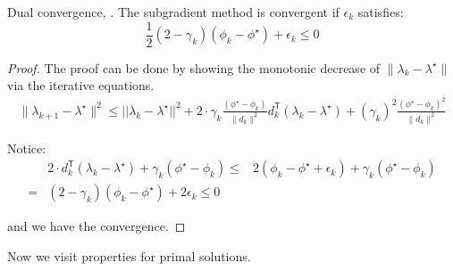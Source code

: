 \documentclass[../main]{subfiles}
\begin{document}
\begin{lemma} \label{lemma:dual_conv} Dual convergence, \cite{brannlund1995generalized}. The
  subgradient method is convergent if \(\epsilon_k\) satisfies:
  \begin{equation}
    \frac{1}{2}(2 - \gamma_k) (\phi_{k} - \phi^\star)  + \epsilon_k \le 0
  \end{equation}
\end{lemma}
\begin{proof}
  The proof can be done by showing the monotonic decrease of
  \(\|\lambda_{k} - \lambda^\star\|\) via the iterative equations.
  \begin{equation}\begin{aligned}
      \|\lambda_{k+1} - \lambda^\star\|^2 \le ||\lambda_k - \lambda^\star||^2
      + 2\cdot \gamma_k \frac{(\phi^\star - \phi_{k})}{\|d_{k}\|^{2}} d_k^\mathsf{T}(\lambda_k - \lambda^\star)
      + (\gamma_{k})^{2} \frac{(\phi^\star - \phi_{k})^{2}}{\|d_{k}\|^{2}}
    \end{aligned}\end{equation}

  Notice: \begin{equation}\begin{aligned}
          & 2  \cdot d_k^\mathsf{T}(\lambda_k - \lambda^\star) + \gamma_{k}(\phi^\star - \phi_{k})
      \le & 2 (\phi_{k} - \phi^\star + \epsilon_k) + \gamma_k(\phi^\star -\phi_k)                  \\
      =   & (2 - \gamma_k) (\phi_{k} - \phi^\star)  + 2\epsilon_k \le 0
    \end{aligned}\end{equation}

  and we have the convergence.
\end{proof}


Now we visit properties for primal solutions.
\end{document}
